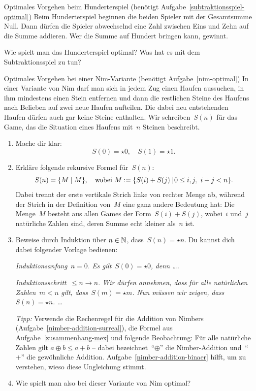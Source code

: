\documentclass{zirkelblatt}
\begin{document}
\begin{aufgabe}{Optimales Vorgehen beim Hunderterspiel
(benötigt Aufgabe~\ref{subtraktionsspiel-optimal})}
Beim Hunderterspiel beginnen die beiden Spieler mit der Gesamtsumme Null. Dann
dürfen die Spieler abwechselnd eine Zahl zwischen Eins und Zehn auf die Summe
addieren. Wer die Summe auf Hundert bringen kann, gewinnt.

Wie spielt man das Hunderterspiel optimal? Was hat es mit dem Subtraktionsspiel
zu tun?
\end{aufgabe}

\begin{aufgabe}{Optimales Vorgehen bei einer Nim-Variante
(benötigt Aufgabe~\ref{nim-optimal})}
In einer Variante von Nim darf man sich in jedem Zug einen Haufen aussuchen, in
ihm mindestens einen Stein entfernen und dann die restlichen Steine des Haufens
nach Belieben auf zwei neue Haufen aufteilen. Die dabei neu entstehenden Haufen
dürfen auch gar keine Steine enthalten. Wir schreiben~$S(n)$ für das Game, das
die Situation eines Haufens mit~$n$ Steinen beschreibt.
\begin{enumerate}
\item Mache dir klar:
\[ S(0) = \star0, \quad S(1) = \star1. \]
\item Erkläre folgende rekursive Formel für~$S(n)$:
\[ S(n) = \{ M \mathrel{|} M \}, \quad \text{wobei $M := \{ S(i) + S(j) \,|\, 0\leq i,j,\
i+j < n \}$}. \]
Dabei trennt der erste vertikale Strich linke von rechter Menge ab, während
der Strich in der Definition von~$M$ eine ganz andere Bedeutung hat: Die
Menge~$M$ besteht aus allen Games der Form~$S(i) + S(j)$, wobei~$i$ und~$j$
natürliche Zahlen sind, deren Summe echt kleiner als~$n$ ist.
\item Beweise durch Induktion über $n \in \mathbb{N}$, dass~$S(n) = \star n$. Du
kannst dich dabei folgender Vorlage bedienen:

\emph{Induktionsanfang~$n = 0$. Es gilt~$S(0) = \star 0$, denn \ldots.}

\emph{Induktionsschritt~$\leq n \to n$. Wir dürfen annehmen, dass für alle
natürlichen Zahlen~$m < n$ gilt, dass~$S(m) = \star m$. Nun müssen wir zeigen,
dass~$S(n) = \star n$. \ldots}

\emph{Tipp:} Verwende die Rechenregel für die Addition von Nimbers
(Aufgabe~\ref{nimber-addition-surreal}), die Formel aus
Aufgabe~\ref{zusammenhang-mex} und folgende Beobachtung: Für alle natürliche
Zahlen gilt $a \oplus b \leq a + b$ -- dabei bezeichnet~"`$\oplus$"' die
Nimber-Addition und~"`$+$"' die gewöhnliche Addition.
Aufgabe~\ref{nimber-addition-binaer} hilft, um zu verstehen, wieso diese
Ungleichung stimmt.
\item Wie spielt man also bei dieser Variante von Nim optimal?
\end{enumerate}
\end{aufgabe}
\end{document}

